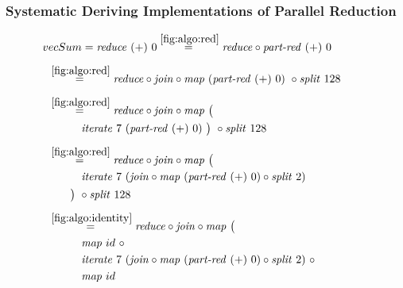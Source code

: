 \subsubsection{Systematic Deriving Implementations of Parallel Reduction}


\begin{figure*}[t]
\begin{align*}
  &\hspace{-1.5em}vecSum = \reduce\ (+)\ 0
%
  \overset{\ref{fig:algo:red}}{=\hspace{.2em}}
      \reduce \circ \partRed\ (+)\ 0\\[.5em]
%
  &\hspace{-2em}\quad\begin{aligned}
    &\overset{\ref{fig:algo:red}}{=\hspace{.2em}}
      \reduce \circ \join \circ \map\ (\partRed\ (+)\ 0)\ \circ \splitN\ 128
  \end{aligned}\\[.5em]
%
  &\hspace{-2em}\quad\begin{aligned}
    &\overset{\ref{fig:algo:red}}{=\hspace{.2em}}
      \reduce \circ \join \circ \map\ \big(\\
    &\qquad\quad\iterateN\ 7\ (\partRed\ (+)\ 0)\ \big)\ \circ \splitN\ 128
  \end{aligned}\\[.5em]
%
  &\hspace{-2em}\quad\begin{aligned}
    &\overset{\ref{fig:algo:red}}{=\hspace{.2em}}
      \reduce \circ \join \circ \map\ \big(\\
    &\qquad\quad\iterateN\ 7\ (\join \circ \map\ (\partRed\ (+)\ 0) \circ \splitN\ 2)\\
    &\qquad\big)\ \circ \splitN\ 128
  \end{aligned}\\[.5em]
%
  &\hspace{-2em}\quad\begin{aligned}
    &\overset{\ref{fig:algo:identity}}{=\hspace{.2em}}
      \reduce \circ \join \circ \map\ \big(\\
    &\qquad\quad\map\ id\ \circ \\
    &\qquad\quad\iterateN\ 7\ (\join \circ \map\ (\partRed\ (+)\ 0) \circ \splitN\ 2)\ \circ\\
    &\qquad\quad\map\ id\\

\end{aligned}
\end{align*}
\end{figure*}
